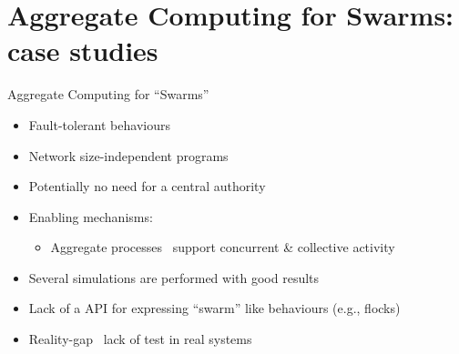 \documentclass[8pt, aspectratio=169, handout]{beamer}
\begin{document}
\section{Aggregate Computing for Swarms: case studies}

\begin{frame}{Aggregate Computing for ``Swarms''}
  \begin{card}[Benefits]
    \begin{itemize}
      \item Fault-tolerant behaviours
      \item Network size-independent programs
      \item Potentially no need for a central authority
      \item Enabling mechanisms:
        \begin{itemize}
          \item Aggregate processes \faArrowRight \, support concurrent \& collective activity
        \end{itemize}
    \end{itemize}
  \end{card}

  \begin{card}
    \begin{itemize}
      \item Several simulations are performed with good results
      \item Lack of a API for expressing ``swarm'' like behaviours (e.g., flocks)
      \item Reality-gap \faArrowRight \, lack of test in real systems
    \end{itemize}
  \end{card}

\end{frame}
\end{document}
